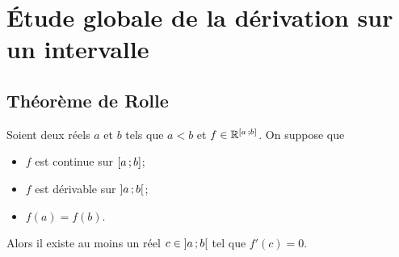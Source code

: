 \section{Étude globale de la dérivation sur un intervalle}

\subsection{Théorème de Rolle}

\begin{theo}
  Soient deux réels \(a\) et \(b\) tels que \(a < b\) et \(f \in \mathbb{R}^{\left[ a \, ;  b \right]}\). On suppose que
  \begin{itemize}
  \item \(f\) est continue sur \(\left[ a \, ;  b \right]\);
  \item \(f\) est dérivable sur \(\left] a \, ;  b \right[\);
  \item \(f(a)=f(b)\).
  \end{itemize}
  Alors il existe au moins un réel \(c \in \left] a \, ;  b \right[\) tel que \(f'(c)=0\).
\end{theo}
